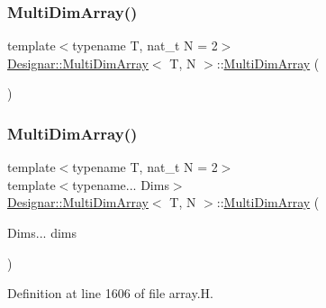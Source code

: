 \subsubsection{\texorpdfstring{Multi\+Dim\+Array()}{MultiDimArray()}\hspace{0.1cm}{\footnotesize\ttfamily [1/4]}}
{\footnotesize\ttfamily template$<$typename T, nat\+\_\+t N = 2$>$ \\
\hyperlink{class_designar_1_1_multi_dim_array}{Designar\+::\+Multi\+Dim\+Array}$<$ T, N $>$\+::\hyperlink{class_designar_1_1_multi_dim_array}{Multi\+Dim\+Array} (\begin{DoxyParamCaption}{ }\end{DoxyParamCaption})\hspace{0.3cm}{\ttfamily [default]}}

\mbox{\label{class_designar_1_1_multi_dim_array_a87e9b411cccc10d39117d1ccdcd66261}} 
\subsubsection{\texorpdfstring{Multi\+Dim\+Array()}{MultiDimArray()}\hspace{0.1cm}{\footnotesize\ttfamily [2/4]}}
{\footnotesize\ttfamily template$<$typename T, nat\+\_\+t N = 2$>$ \\
template$<$typename... Dims$>$ \\
\hyperlink{class_designar_1_1_multi_dim_array}{Designar\+::\+Multi\+Dim\+Array}$<$ T, N $>$\+::\hyperlink{class_designar_1_1_multi_dim_array}{Multi\+Dim\+Array} (\begin{DoxyParamCaption}\item[{Dims...}]{dims }\end{DoxyParamCaption})\hspace{0.3cm}{\ttfamily [inline]}}



Definition at line 1606 of file array.\+H.

\mbox{\label{class_designar_1_1_multi_dim_array_a4dd6166b45028efc4bab7cd42c492663}} 

